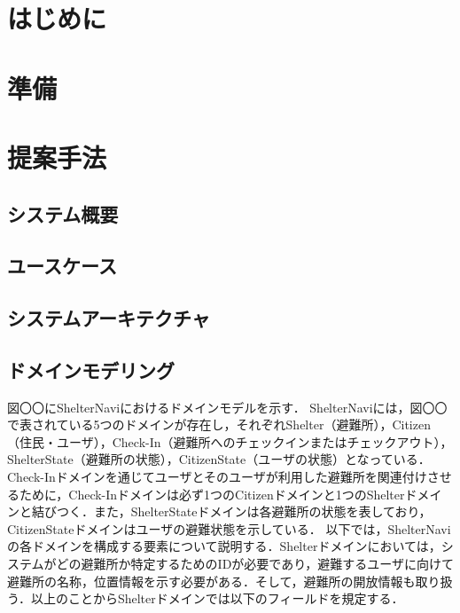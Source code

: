 \documentclass[technicalreport]{ieicej}
\begin{document}
\begin{jabstract}
\end{jabstract}
\begin{jkeyword}
\end{jkeyword}
\begin{eabstract}
\end{eabstract}
\begin{ekeyword}
\end{ekeyword}
\maketitle

\section{はじめに}

\section{準備}

\section{提案手法}
\subsection{システム概要}

\subsection{ユースケース}

\subsection{システムアーキテクチャ}

\subsection{ドメインモデリング}
図〇〇にShelterNaviにおけるドメインモデルを示す．
ShelterNaviには，図〇〇で表されている5つのドメインが存在し，それぞれShelter（避難所），Citizen（住民・ユーザ），Check-In（避難所へのチェックインまたはチェックアウト），ShelterState（避難所の状態），CitizenState（ユーザの状態）となっている．Check-Inドメインを通じてユーザとそのユーザが利用した避難所を関連付けさせるために，Check-Inドメインは必ず1つのCitizenドメインと1つのShelterドメインと結びつく．また，ShelterStateドメインは各避難所の状態を表しており，CitizenStateドメインはユーザの避難状態を示している．
以下では，ShelterNaviの各ドメインを構成する要素について説明する．Shelterドメインにおいては，システムがどの避難所か特定するためのIDが必要であり，避難するユーザに向けて避難所の名称，位置情報を示す必要がある．そして，避難所の開放情報も取り扱う．以上のことからShelterドメインでは以下のフィールドを規定する．
\end{document}
